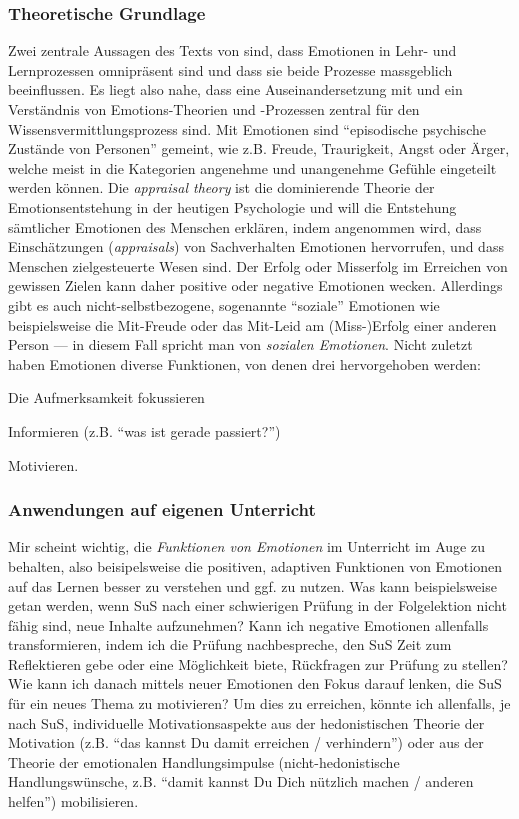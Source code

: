 \begin{myExBox}[title=Emotionen verstehen und positiv beeinflussen]
\subsubsection*{Theoretische Grundlage}
Zwei zentrale Aussagen des Texts von \textcite{alma99116838938605511} sind, dass Emotionen in Lehr- und Lernprozessen omnipräsent sind und dass sie beide Prozesse massgeblich beeinflussen. Es liegt also nahe, dass eine Auseinandersetzung mit und ein Verständnis von Emotions-Theorien und -Prozessen zentral für den Wissensvermittlungsprozess sind. Mit Emotionen sind \enquote{episodische psychische Zustände von Personen} gemeint, wie z.B. Freude, Traurigkeit, Angst oder Ärger, welche meist in die Kategorien angenehme und unangenehme Gefühle eingeteilt werden können. Die \textit{appraisal theory} ist die dominierende Theorie der Emotionsentstehung in der heutigen Psychologie und will die Entstehung sämtlicher Emotionen des Menschen erklären, indem angenommen wird, dass Einschätzungen (\textit{appraisals}) von Sachverhalten Emotionen hervorrufen, und dass Menschen zielgesteuerte Wesen sind. Der Erfolg oder Misserfolg im Erreichen von gewissen Zielen kann daher positive oder negative Emotionen wecken. Allerdings gibt es auch nicht-selbstbezogene, sogenannte \enquote{soziale} Emotionen wie beispielsweise die Mit-Freude oder das Mit-Leid am (Miss-)Erfolg einer anderen Person --- in diesem Fall spricht man von \textit{sozialen Emotionen}. Nicht zuletzt haben Emotionen diverse Funktionen, von denen drei hervorgehoben werden: \begin{enumerate*}
\item Die Aufmerksamkeit fokussieren
\item Informieren (z.B. \enquote{was ist gerade passiert?})
\item Motivieren.
\end{enumerate*}

\subsubsection*{Anwendungen auf eigenen Unterricht}
Mir scheint wichtig, die \textit{Funktionen von Emotionen} im Unterricht im Auge zu behalten, also beisipelsweise die positiven, adaptiven Funktionen von Emotionen auf das Lernen besser zu verstehen und ggf. zu nutzen. Was kann beispielsweise getan werden, wenn SuS nach einer schwierigen Prüfung in der Folgelektion nicht fähig sind, neue Inhalte aufzunehmen? Kann ich negative Emotionen allenfalls transformieren, indem ich die Prüfung nachbespreche, den SuS Zeit zum Reflektieren gebe oder eine Möglichkeit biete, Rückfragen zur Prüfung zu stellen? Wie kann ich danach mittels neuer Emotionen den Fokus darauf lenken, die SuS für ein neues Thema zu motivieren? Um dies zu erreichen, könnte ich allenfalls, je nach SuS, individuelle Motivationsaspekte aus der hedonistischen Theorie der Motivation (z.B. \enquote{das kannst Du damit erreichen / verhindern}) oder aus der Theorie der emotionalen Handlungsimpulse (nicht-hedonistische Handlungswünsche, z.B. \enquote{damit kannst Du Dich nützlich machen / anderen helfen}) mobilisieren.\end{myExBox}

